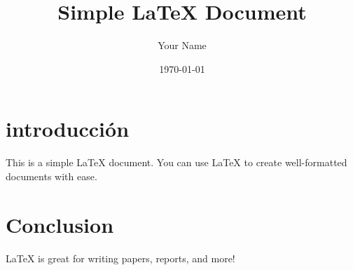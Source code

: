 \documentclass{article}
\begin{document}
\title{Simple LaTeX Document}
\author{Your Name}
\date{\today}

\maketitle

\section{introducción}
This is a simple LaTeX document. You can use LaTeX to create well-formatted documents with ease.

\section{Conclusion}
LaTeX is great for writing papers, reports, and more!
\end{document}
